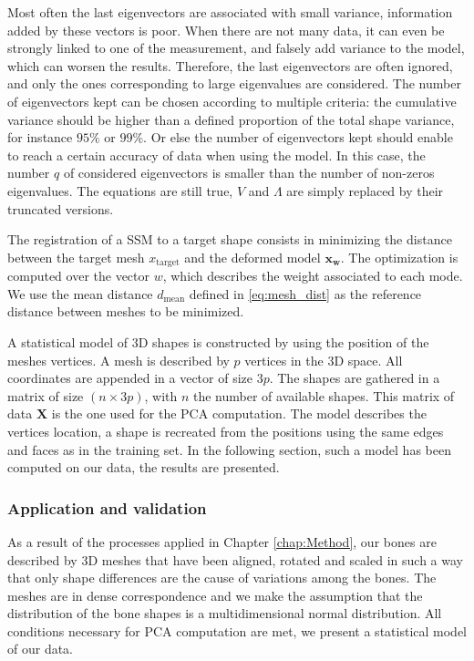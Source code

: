 Most often the last eigenvectors are associated with small variance, information added by these vectors is poor. When there are not many data, it can even be strongly linked to one of the measurement, and falsely add variance to the model, which can worsen the results. Therefore, the last eigenvectors are often ignored, and only the ones corresponding to large eigenvalues are considered. The number of eigenvectors kept can be chosen according to multiple criteria: the cumulative variance should be higher than a defined proportion of the total shape variance, for instance $95\%$ or $99\%$. Or else the number of eigenvectors kept should enable to reach a certain accuracy of data when using the model. In this case, the number $q$ of considered eigenvectors is smaller than the number of non-zeros eigenvalues. The equations are still true, $V$ and $\Lambda$ are simply replaced by their truncated versions. 


The registration of a SSM to a target shape consists in minimizing the distance between the target mesh $x_{\text{target}}$ and the deformed model $\mathbf{x_w}$. The optimization is computed over the vector $w$, which describes the weight associated to each mode. We use the mean distance $d_{\text{mean}}$ defined in \eqref{eq:mesh_dist} as the reference distance between meshes to be minimized.  


A statistical model of 3D shapes is constructed by using the position of the meshes vertices. A mesh is described by $p$ vertices in the 3D space. All coordinates are appended in a vector of size $3p$. The shapes are gathered in a matrix of size $(n \times 3p)$, with $n$ the number of available shapes. This matrix of data $\mathbf{X}$ is the one used for the PCA computation. 
The model describes the vertices location, a shape is recreated from the positions using the same edges and faces as in the training set. In the following section, such a model has been computed on our data, the results are presented. 


\subsubsection{Application and validation}
\label{ssubsec:4_PCA_validation}

As a result of the processes applied in Chapter \ref{chap:Method}, our bones are described by 3D meshes that have been aligned, rotated and scaled in such a way that only shape differences are the cause of variations among the bones. The meshes are in dense correspondence and we make the assumption that the distribution of the bone shapes is a multidimensional normal distribution. All conditions necessary for PCA computation are met, we present a statistical model of our data.

